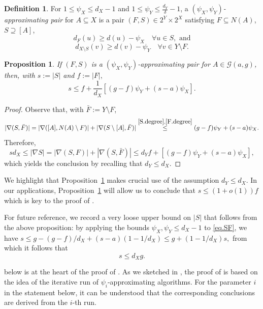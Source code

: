 \documentclass[a4paper]{amsart}
\newtheorem{prop}[thm]{Proposition}
\theoremstyle{definition}
\newtheorem{mydef}[thm]{Definition}
\newcommand{\cG}{\mathcal{G} }
\newcommand{\beq}[1]{\begin{equation}\label{#1}}
\newcommand{\enq}[0]{\end{equation}}
\newcommand{\sub}[0]{\subseteq}
\newcommand{\0}[0]{\emptyset}
\begin{document}
\begin{mydef}\label{def:psi-approximation}
    For $1 \le \psi_X\leq d_X-1$ and $1\leq \psi_Y \le \frac{d_Y}{\delta}-1$, a \textit{$(\psi_X, \psi_Y)$-approximating pair} for $A \sub X$ is a pair $(F,S) \in 2^Y \times 2^X$ satisfying $F \sub N(A)$, $S \supseteq [A]$,
    \beq{S.degree} d_F(u) \ge d(u)-\psi_X \quad \forall u \in S, \text{ and}\enq
    \beq{F.degree} d_{X \setminus S}(v) \ge d(v)-\psi_Y \quad \forall v \in Y \setminus F.\enq
\end{mydef}

\begin{prop}\label{SF_size}
    If $(F,S)$ is a $(\psi_X, \psi_Y)$-approximating pair for $A \in \cG(a,g)$, then, with $s:=|S|$ and $f:=|F|,$
    \beq{eq.SF} s \le f+\frac{1}{d_X}[(g-f)\psi_Y+(s-a)\psi_X].\enq
\end{prop}

\begin{proof}
Observe that, with $\bar F:=Y \setminus F$,
\[|\nabla(S, \bar F)|=|\nabla([A], N(A) \setminus F)|+|\nabla(S \setminus [A], \bar F)| \stackrel{\eqref{S.degree},\eqref{F.degree}}{\le} (g-f)\psi_Y+(s-a)\psi_X.\]
Therefore,
\[s d_X\leq|\nabla S|=|\nabla(S,F)|+|\nabla(S, \bar F)| \le d_Y f+[(g-f)\psi_Y+(s-a)\psi_X],\]
which yields the conclusion by recalling that $d_Y\leq d_X$.
\end{proof}

We highlight that Proposition~\ref{SF_size} makes crucial use of the assumption $d_Y\leq d_X$. In our applications, Proposition~\ref{SF_size} will allow us to conclude that $s \le (1+o(1))f$ which is key to the proof of .

For future reference, we record a very loose upper bound on $|S|$ that follows from the above proposition: by applying the bounds $\psi_X, \psi_Y\leq d_X-1$ to \eqref{eq.SF}, we have $s \le g-(g-f)/d_X+(s-a)(1-1/d_X)\le g+(1-1/d_X)s,$ from which it follows that
\beq{s_loose} s \le d_Xg. \enq

 below is at the heart of the proof of . As we sketched in , the proof of  is based on the idea of the iterative run of $\psi_i$-approximating algorithms. For the parameter $i$ in the statement below, it can be understood that the corresponding conclusions are derived from the $i$-th run.
\end{document}
